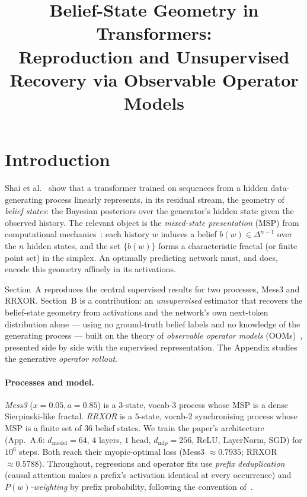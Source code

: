 \documentclass[11pt]{article}
\title{\vspace{-2.5em}Belief-State Geometry in Transformers:\\
Reproduction and Unsupervised Recovery via Observable Operator Models}
\author{}
\date{}
\begin{document}
\maketitle
\vspace{-3em}

\section{Introduction}

Shai et al.~\cite{shai2024} show that a transformer trained on sequences from a hidden
data-generating process linearly represents, in its residual stream, the geometry of
\emph{belief states}: the Bayesian posteriors over the generator's hidden state given the
observed history. The relevant object is the \emph{mixed-state presentation} (MSP) from
computational mechanics~\cite{crutchfield1989,shalizi2001}: each history $w$ induces a
belief $b(w)\in\Delta^{n-1}$ over the $n$ hidden states, and the set $\{b(w)\}$ forms a
characteristic fractal (or finite point set) in the simplex. An optimally predicting network
must, and does, encode this geometry affinely in its activations.

Section~A reproduces the central supervised results for two processes, Mess3 and RRXOR.
Section~B is a contribution: an \emph{unsupervised} estimator that recovers the belief-state
geometry from activations and the network's own next-token distribution alone --- using no
ground-truth belief labels and no knowledge of the generating process --- built on the theory
of \emph{observable operator models} (OOMs)~\cite{jaeger2000,thon2015}, presented side by side
with the supervised representation. The Appendix studies the generative \emph{operator
rollout}.

\paragraph{Processes and model.} \emph{Mess3} ($x{=}0.05,a{=}0.85$) is a $3$-state, vocab-$3$
process whose MSP is a dense Sierpinski-like fractal. \emph{RRXOR} is a $5$-state, vocab-$2$
synchronising process whose MSP is a finite set of $36$ belief states. We train the paper's
architecture (App.~A.6: $d_{\mathrm{model}}{=}64$, $4$ layers, $1$ head, $d_{\mathrm{mlp}}{=}256$,
ReLU, LayerNorm, SGD) for $10^6$ steps. Both reach their myopic-optimal loss (Mess3
$\approx 0.7935$; RRXOR $\approx 0.5788$). Throughout, regressions and operator fits use
\emph{prefix deduplication} (causal attention makes a prefix's activation identical at every
occurrence) and \emph{$P(w)$-weighting} by prefix probability, following the convention
of~\cite{riechers2025}.
\end{document}
